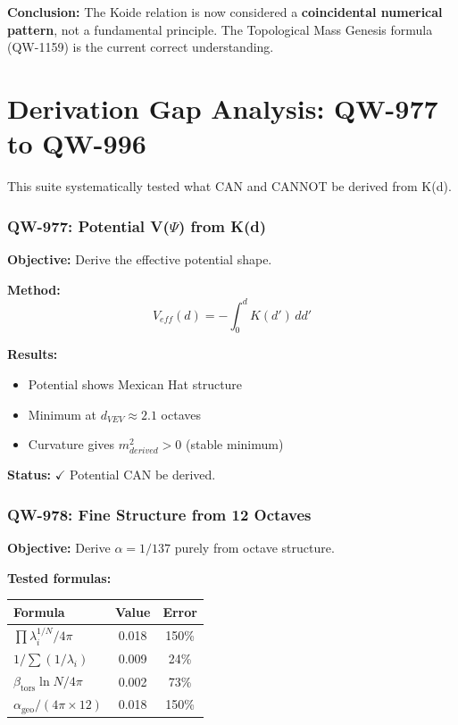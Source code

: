 \documentclass[11pt,a4paper]{book}
\theoremstyle{remark}
\newcommand{\alphageo}{\alpha_{\text{geo}}}
\newcommand{\betators}{\beta_{\text{tors}}}
\begin{document}
\textbf{Conclusion:} The Koide relation is now considered a \textbf{coincidental numerical pattern}, not a fundamental principle. The Topological Mass Genesis formula (QW-1159) is the current correct understanding.

\part{Derivation Gap Analysis: QW-977 to QW-996}

This suite systematically tested what CAN and CANNOT be derived from K(d).

\section{QW-977: Potential V($\Psi$) from K(d)}

\textbf{Objective:} Derive the effective potential shape.

\textbf{Method:}
\begin{equation}
V_{eff}(d) = -\int_0^d K(d') \, dd'
\end{equation}

\textbf{Results:}
\begin{itemize}
    \item Potential shows Mexican Hat structure
    \item Minimum at $d_{VEV} \approx 2.1$ octaves
    \item Curvature gives $m^2_{derived} > 0$ (stable minimum)
\end{itemize}

\textbf{Status:} $\checkmark$ Potential CAN be derived.

\section{QW-978: Fine Structure from 12 Octaves}

\textbf{Objective:} Derive $\alpha = 1/137$ purely from octave structure.

\textbf{Tested formulas:}
\begin{center}
\begin{tabular}{|l|c|c|}
\hline
\textbf{Formula} & \textbf{Value} & \textbf{Error} \\
\hline
$\prod\lambda_i^{1/N} / 4\pi$ & 0.018 & 150\% \\
$1 / \sum(1/\lambda_i)$ & 0.009 & 24\% \\
$\betators \ln N / 4\pi$ & 0.002 & 73\% \\
$\alphageo / (4\pi \times 12)$ & 0.018 & 150\% \\
\hline
\end{tabular}
\end{center}
\end{document}
